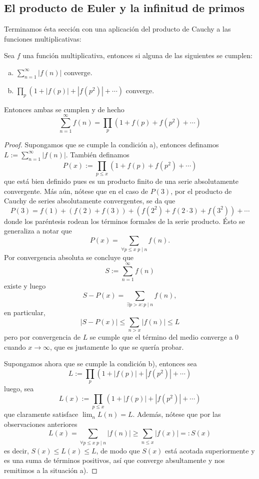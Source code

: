 \documentclass[teoria-numeros.tex]{subfiles}
\begin{document}
\subsection{El producto de Euler y la infinitud de primos}
Terminamos ésta sección con una aplicación del producto de Cauchy a las funciones multiplicativas:

\begin{thm}
	Sea $f$ una función multiplicativa, entonces si alguna de las siguientes se cumplen:
	\begin{enumerate}[a)]
		\item $\sum_{n=1}^\infty |f(n)|$ converge.
		\item $\prod_p (1 + |f(p)| + |f(p^2)| + \cdots)$ converge.
	\end{enumerate}
	Entonces ambas se cumplen y de hecho
	$$ \sum_{n=1}^\infty f(n) = \prod_p (1 + f(p) + f(p^2) + \cdots) $$
\end{thm}
\begin{proof}
	Supongamos que se cumple la condición a), entonces definamos $L := \sum_{n=1}^\infty |f(n)|$.
	También definamos
	$$ P(x) := \prod_{p\le x} (1 + f(p) + f(p^2) + \cdots) $$
	que está bien definido pues es un producto finito de una serie absolutamente convergente.
	Más aún, nótese que en el caso de $P(3)$, por el producto de Cauchy de series absolutamente convergentes, se da que
	$$ P(3) = f(1) + ( f(2) + f(3) ) + ( f(2^2) + f(2\cdot 3) + f(3^2) ) + \cdots $$
	donde los paréntesis rodean los términos formales de la serie producto.
	Ésto se generaliza a notar que
	$$ P(x) = \sum_{\forall p\le x \; p\mid n} f(n). $$
	Por convergencia absoluta se concluye que
	$$ S := \sum_{n=1}^\infty f(n) $$
	existe y luego
	$$ S - P(x) = \sum_{\exists p>x : p\mid n} f(n), $$
	en particular,
	$$ |S - P(x)| \le \sum_{n > x} |f(n)| \le L $$
	pero por convergencia de $L$ se cumple que el término del medio converge a 0 cuando $x \to \infty$,
	que es justamente lo que se quería probar.

	Supongamos ahora que se cumple la condición b), entonces sea
	$$ L := \prod_p ( 1 + |f(p)| + |f(p^2)| + \cdots ) $$
	luego, sea
	$$ L(x) := \prod_{p\le x} ( 1 + |f(p)| + |f(p^2)| + \cdots ) $$
	que claramente satisface $\lim_n L(n) = L$.
	Además, nótese que por las observaciones anteriores
	$$ L(x) = \sum_{\forall p\le x \; p\mid n} |f(n)| \ge \sum_{n\le x} |f(x)| =: S(x) $$
	es decir, $S(x) \le L(x) \le L$, de modo que $S(x)$ está acotada superiormente y es una suma de términos positivos, así que converge
	absultamente y nos remitimos a la situación a).
\end{proof}
\end{document}
